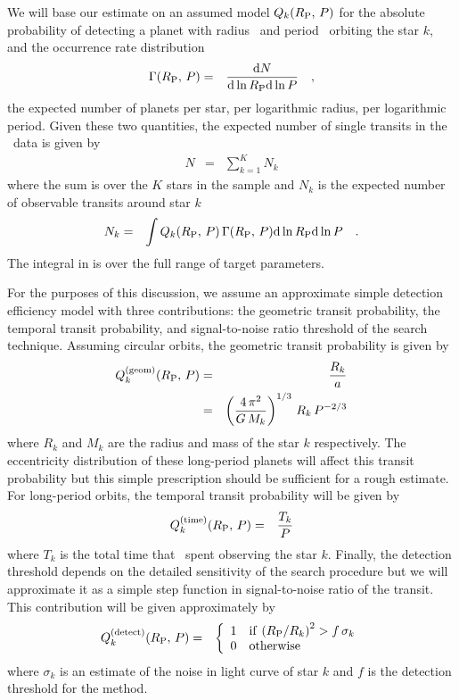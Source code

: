 We will base our estimate on an assumed model $Q_k({R_\mathrm{P}},\,{P})$ for the
absolute probability of detecting a planet with radius \rp\ and period
\period\ orbiting the star $k$, and the occurrence rate distribution
\begin{eqnarray}
{\ensuremath{\Gamma}} ({R_\mathrm{P}},\,{P}) &=& \frac{\mathrm{d} N}{\mathrm{d}\ln{\ensuremath{R_\mathrm{P}}}\mathrm{d}\ln{\ensuremath{P}}} \quad,
\end{eqnarray}
the expected number of planets per star, per logarithmic radius, per
logarithmic period.
Given these two quantities, the expected number of single transits in the
\kepler\ data is given by
\begin{eqnarray}
N &=& \sum_{k=1}^K N_k
\end{eqnarray}
where the sum is over the $K$ stars in the sample and $N_k$ is the expected
number of observable transits around star $k$
\begin{eqnarray}\eqlabel{nk}
N_k &=& \int Q_k(\rp,\,\period) \, \rate (\rp,\,\period)
    \dd\ln\rp \dd\ln\period \quad.
\end{eqnarray}
The integral in  is over the full range of target parameters.

For the purposes of this discussion, we assume an approximate simple detection
efficiency model with three contributions: the geometric transit probability,
the temporal transit probability, and signal-to-noise ratio threshold of the
search technique.
Assuming circular orbits, the geometric transit probability is given by
\citep{Winn:2010}
\begin{eqnarray}\eqlabel{q-geom}
Q_k^\mathrm{(geom)}(\rp,\,\period) &=& \frac{R_k}{a} \\
&=& \left( \frac{4\,\pi^2}{G\,M_k} \right)^{1/3} \, R_k \, \period^{-2/3}
\end{eqnarray}
where $R_k$ and $M_k$ are the radius and mass of the star $k$ respectively.
The eccentricity distribution of these long-period planets will affect this
transit probability \citep{Kipping:2014} but this simple prescription should
be sufficient for a rough estimate.
For long-period orbits, the temporal transit probability will be given by
\begin{eqnarray}\eqlabel{q-time}
Q_k^\mathrm{(time)}(\rp,\,\period) &=& \frac{T_k}{\period}
\end{eqnarray}
where $T_k$ is the total time that \kepler\ spent observing the star $k$.
Finally, the detection threshold depends on the detailed sensitivity of the
search procedure but we will approximate it as a simple step function in
signal-to-noise ratio of the transit.
This contribution will be given approximately by
\begin{eqnarray}
Q_k^\mathrm{(detect)}({R_\mathrm{P}},\,{P}) &=& \left\{\begin{array}{ll}
1 & \mathrm{if}\,\left({R_\mathrm{P}}/R_k\right)^2 > f\,\sigma_k \\
0 & \mathrm{otherwise}
\end{array}\right.
\end{eqnarray}
where $\sigma_k$ is an estimate of the noise in light curve of star $k$ and
$f$ is the detection threshold for the method.

